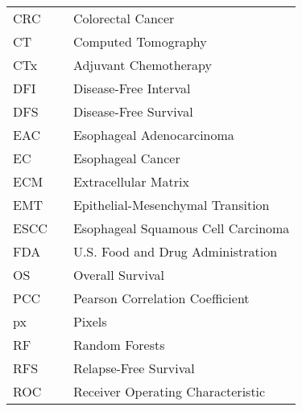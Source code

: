 \begin{abbreviations}
\begin{longtable}{@{\extracolsep{\fill}}lll@{}}
CRC & & Colorectal Cancer \\
CT & & Computed Tomography \\
CTx & & Adjuvant Chemotherapy \\
DFI & & Disease-Free Interval \\
DFS & & Disease-Free Survival \\
EAC & & Esophageal Adenocarcinoma \\
EC & & Esophageal Cancer \\
ECM & & Extracellular Matrix \\
EMT & & Epithelial-Mesenchymal Transition \\
ESCC & & Esophageal Squamous Cell Carcinoma \\
FDA & & U.S. Food and Drug Administration \\
OS & & Overall Survival \\
PCC & & Pearson Correlation Coefficient \\
px & & Pixels \\
RF & & Random Forests \\
RFS & & Relapse-Free Survival \\
ROC & & Receiver Operating Characteristic \\
\end{longtable}
\clearpage
\end{abbreviations}